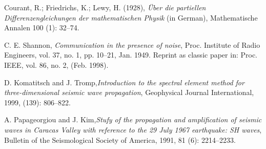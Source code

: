 \documentclass[12pt,letterpaper,landscape]{article}
\begin{document}
\begin{thebibliography}{1}
 Courant, R.; Friedrichs, K.; Lewy, H. (1928), \emph{\"Uber
die partiellen Differenzengleichungen der mathematischen Physik} (in
German), Mathematische Annalen 100 (1): 32--74.

 C. E. Shannon, \emph{Communication in the presence
of noise}, Proc. Institute of Radio Engineers, vol. 37, no. 1, pp.
10--21, Jan. 1949. Reprint as classic paper in: Proc. IEEE, vol. 86,
no. 2, (Feb. 1998).

 D. Komatitsch and J. Tromp,\emph{Introduction
to the spectral element method for three-dimensional seismic wave
propagation}, Geophysical Journal International, 1999, (139): 806--822.

 A. Papageorgiou and J. Kim,\emph{Stufy of
the propagation and amplification of seismic waves in Caracas Valley
with reference to the 29 July 1967 earthquake: SH waves}, Bulletin
of the Seismological Society of America, 1991, 81 (6): 2214--2233. \end{thebibliography}
\end{document}
